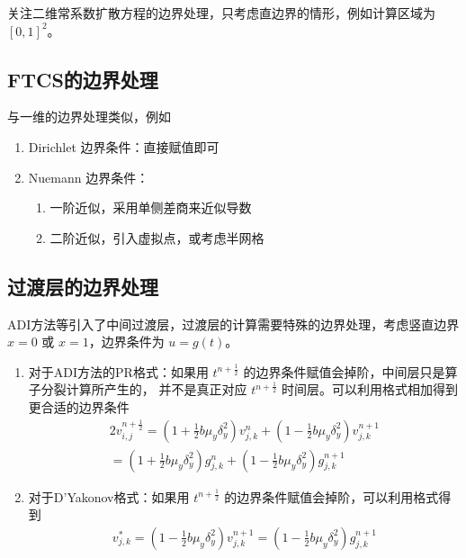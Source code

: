 关注二维常系数扩散方程的边界处理，只考虑直边界的情形，例如计算区域为 $[0,1]^2$。

\subsection*{FTCS的边界处理}

与一维的边界处理类似，例如
\begin{enumerate}
    \item Dirichlet 边界条件：直接赋值即可
    \item Nuemann 边界条件：
          \begin{enumerate}
              \item 一阶近似，采用单侧差商来近似导数
              \item 二阶近似，引入虚拟点，或考虑半网格
          \end{enumerate}
\end{enumerate}

\subsection*{过渡层的边界处理}

ADI方法等引入了中间过渡层，过渡层的计算需要特殊的边界处理，考虑竖直边界 $x=0$ 或 $x=1$，边界条件为 $u=g(t)$。

\begin{enumerate}
    \item 对于ADI方法的PR格式：如果用 $t^{n+\frac12}$ 的边界条件赋值会掉阶，中间层只是算子分裂计算所产生的，
          并不是真正对应 $t^{n+\frac12}$ 时间层。可以利用格式相加得到更合适的边界条件
          \begin{align*}
              2 v_{i,j}^{n+\frac12} =   \left(1+\frac12 b \mu_y \delta_y^2\right) v_{j,k}^{n}
              + \left(1-\frac12 b \mu_y \delta_y^2\right) v_{j,k}^{n+1}
              \\
              =   \left(1+\frac12 b \mu_y \delta_y^2\right) g_{j,k}^{n}
              + \left(1-\frac12 b \mu_y \delta_y^2\right) g_{j,k}^{n+1}
          \end{align*}
    \item 对于D'Yakonov格式：如果用 $t^{n+\frac12}$ 的边界条件赋值会掉阶，可以利用格式得到
          \begin{align*}
              v_{j,k}^{*}   =    \left(1-\frac12 b \mu_y \delta_y^2 \right) v_{j,k}^{n+1}
              =  \left(1-\frac12 b \mu_y \delta_y^2 \right) g_{j,k}^{n+1}
          \end{align*}
\end{enumerate}

